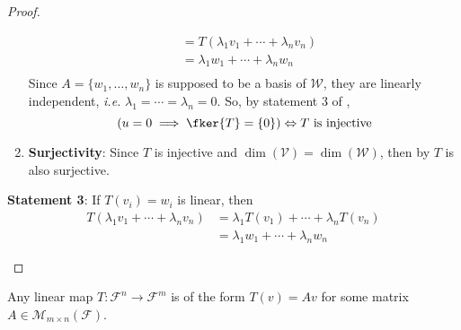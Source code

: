 \begin{proof}
\begin{flushleft}
\begin{enumerate}
\begin{align*}
				           & =T(\lambda_1v_1+\cdots+\lambda_nv_n) \\
				           & =\lambda_1w_1+\cdots+\lambda_nw_n    \\
			      \end{align*}
			      Since $A=\{w_1,\dots,w_n\}$ is supposed to be a basis of $\mathcal{W}$,
			      they are linearly independent, \textit{i.e.} $\lambda_1=\cdots=\lambda_n=0$.
			      So, by statement 3 of ,
			      \begin{equation*}
				      \left(u=0 \implies \fker{T}=\{0\}\right) \Leftrightarrow T \text{ is injective}
			      \end{equation*}
			\item \textbf{Surjectivity}: Since $T$ is injective and $\dim(\mathcal{V})=\dim(\mathcal{W})$,
			      then by  $T$ is also
			      surjective.
		\end{enumerate}
	\end{flushleft}
	\begin{flushleft}
		\textbf{Statement 3}: If $T(v_i)=w_i$ is linear, then
		\begin{align*}
			T(\lambda_1v_1+\cdots+\lambda_nv_n) & =\lambda_1T(v_1)+\cdots+\lambda_nT(v_n) \\
			                                    & =\lambda_1w_1+\cdots+\lambda_nw_n
		\end{align*}
	\end{flushleft}
\end{proof}

\begin{crl}\label{crl-matrix-rep-linear-map}
	Any linear map $T:\mathcal{F}^n\to\mathcal{F}^m$ is of the form $T(v)=Av$
	for some matrix $A\in\mathcal{M}_{m \times n}(\mathcal{F})$.
\end{crl}

